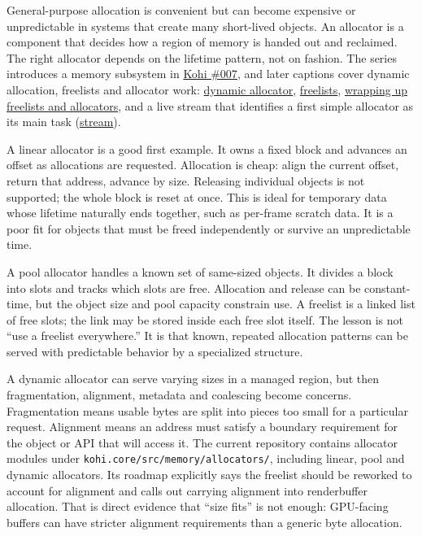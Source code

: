 General-purpose allocation is convenient but can become expensive or unpredictable in systems that create many short-lived objects. An allocator is a component that decides how a region of memory is handed out and reclaimed. The right allocator depends on the lifetime pattern, not on fashion. The series introduces a memory subsystem in \href{https://www.youtube.com/watch?v=_GBUCo2FbUk}{Kohi \#007}, and later captions cover dynamic allocation, freelists and allocator work: \href{https://www.youtube.com/watch?v=BSBFBWwG8Ds}{dynamic allocator}, \href{https://www.youtube.com/watch?v=sP7xRUyP3e0}{freelists}, \href{https://www.youtube.com/watch?v=SNDJ-rGJd5A}{wrapping up freelists and allocators}, and a live stream that identifies a first simple allocator as its main task (\href{https://www.youtube.com/watch?v=3ZFcvBjRFN0}{stream}).

A linear allocator is a good first example. It owns a fixed block and advances an offset as allocations are requested. Allocation is cheap: align the current offset, return that address, advance by size. Releasing individual objects is not supported; the whole block is reset at once. This is ideal for temporary data whose lifetime naturally ends together, such as per-frame scratch data. It is a poor fit for objects that must be freed independently or survive an unpredictable time.

A pool allocator handles a known set of same-sized objects. It divides a block into slots and tracks which slots are free. Allocation and release can be constant-time, but the object size and pool capacity constrain use. A freelist is a linked list of free slots; the link may be stored inside each free slot itself. The lesson is not ``use a freelist everywhere.'' It is that known, repeated allocation patterns can be served with predictable behavior by a specialized structure.

A dynamic allocator can serve varying sizes in a managed region, but then fragmentation, alignment, metadata and coalescing become concerns. Fragmentation means usable bytes are split into pieces too small for a particular request. Alignment means an address must satisfy a boundary requirement for the object or API that will access it. The current repository contains allocator modules under \texttt{kohi.core/src/memory/allocators/}, including linear, pool and dynamic allocators. Its roadmap explicitly says the freelist should be reworked to account for alignment and calls out carrying alignment into renderbuffer allocation. That is direct evidence that ``size fits'' is not enough: GPU-facing buffers can have stricter alignment requirements than a generic byte allocation.

